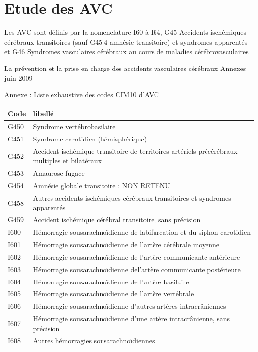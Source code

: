 \documentclass[12pt,english,french,twoside]{report}\usepackage[]{graphicx}\usepackage[]{color}
\begin{document}
\section{Etude des AVC}

Les AVC sont définis par la nomenclature I60 à I64, G45 Accidents ischémiques cérébraux transitoires (sauf G45.4 amnésie transitoire) et syndromes apparentés et G46 Syndromes vasculaires cérébraux au cours de maladies cérébrovasculaires

La prévention et la prise en charge des accidents vasculaires cérébraux  Annexes 
juin 2009

Annexe : Liste exhaustive des codes CIM10 d’AVC

\begin{longtable}{|l|l|}
 \hline
 Code & libellé\\
 \hline
 G450 & Syndrome vertébrobasilaire \\
 G451 & Syndrome carotidien (hémisphérique) \\
 G452 & Accident ischémique transitoire de territoires artériels précérébraux multiples et bilatéraux \\
 G453 & Amaurose fugace \\
 G454 & Amnésie globale transitoire : NON RETENU \\
 G458 & Autres accidents ischémiques cérébraux transitoires et syndromes apparentés \\
 G459 & Accident ischémique cérébral transitoire, sans précision \\
 I600 & Hémorragie sousarachnoïdienne de labifurcation et du siphon carotidien \\
 I601 & Hémorragie sousarachnoïdienne de l'artère cérébrale moyenne \\
 I602 & Hémorragie sousarachnoïdienne de l'artère communicante antérieure \\
 I603 & Hémorragie sousarachnoïdienne del'artère communicante postérieure \\
 I604 & Hémorragie sousarachnoïdienne de l'artère basilaire \\
 I605 & Hémorragie sousarachnoïdienne de l'artère vertébrale \\
 I606 & Hémorragie sousarachnoïdienne d'autres artères intracrâniennes \\
 I607 & Hémorragie sousarachnoïdienne d'une artère intracrânienne, sans précision \\
 I608 & Autres hémorragies sousarachnoïdiennes \\

\end{longtable}
\end{document}
